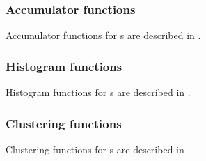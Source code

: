 \subsubsection{Accumulator functions}
Accumulator functions for \Parray{}s are described in
. 

\subsubsection{Histogram functions}
Histogram functions for \Parray{}s are described in
. 

\subsubsection{Clustering functions}
Clustering functions for \Parray{}s are described in
. 

